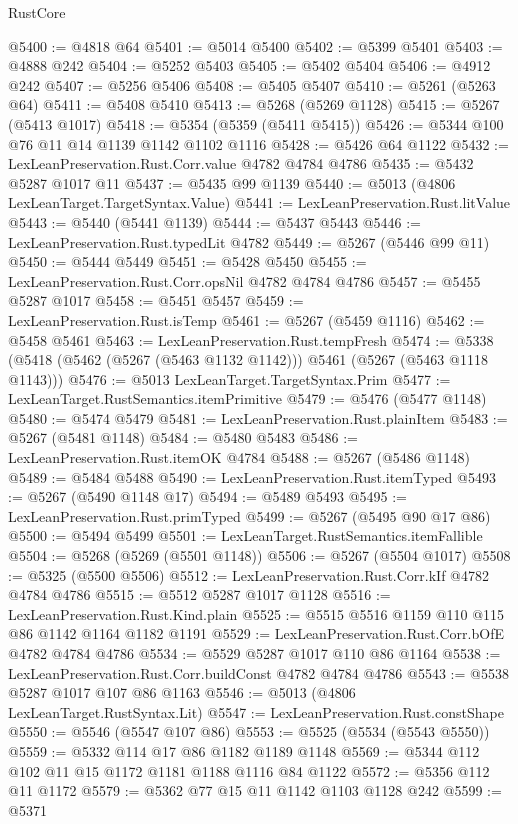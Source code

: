 \begin{lexlean}{RustCore}
\begin{coremodule}
@5400 := @4818 @64
@5401 := @5014 @5400
@5402 := @5399 @5401
@5403 := @4888 @242
@5404 := @5252 @5403
@5405 := @5402 @5404
@5406 := @4912 @242
@5407 := @5256 @5406
@5408 := @5405 @5407
@5410 := @5261 (@5263 @64)
@5411 := @5408 @5410
@5413 := @5268 (@5269 @1128)
@5415 := @5267 (@5413 @1017)
@5418 := @5354 (@5359 (@5411 @5415))
@5426 := @5344 @100 @76 @11 @14 @1139 @1142 @1102 @1116
@5428 := @5426 @64 @1122
@5432 := LexLeanPreservation.Rust.Corr.value @4782 @4784 @4786
@5435 := @5432 @5287 @1017 @11
@5437 := @5435 @99 @1139
@5440 := @5013 (@4806 LexLeanTarget.TargetSyntax.Value)
@5441 := LexLeanPreservation.Rust.litValue
@5443 := @5440 (@5441 @1139)
@5444 := @5437 @5443
@5446 := LexLeanPreservation.Rust.typedLit @4782
@5449 := @5267 (@5446 @99 @11)
@5450 := @5444 @5449
@5451 := @5428 @5450
@5455 := LexLeanPreservation.Rust.Corr.opsNil @4782 @4784 @4786
@5457 := @5455 @5287 @1017
@5458 := @5451 @5457
@5459 := LexLeanPreservation.Rust.isTemp
@5461 := @5267 (@5459 @1116)
@5462 := @5458 @5461
@5463 := LexLeanPreservation.Rust.tempFresh
@5474 := @5338 (@5418 (@5462 (@5267 (@5463 @1132 @1142))) @5461 (@5267 (@5463 @1118 @1143)))
@5476 := @5013 LexLeanTarget.TargetSyntax.Prim
@5477 := LexLeanTarget.RustSemantics.itemPrimitive
@5479 := @5476 (@5477 @1148)
@5480 := @5474 @5479
@5481 := LexLeanPreservation.Rust.plainItem
@5483 := @5267 (@5481 @1148)
@5484 := @5480 @5483
@5486 := LexLeanPreservation.Rust.itemOK @4784
@5488 := @5267 (@5486 @1148)
@5489 := @5484 @5488
@5490 := LexLeanPreservation.Rust.itemTyped
@5493 := @5267 (@5490 @1148 @17)
@5494 := @5489 @5493
@5495 := LexLeanPreservation.Rust.primTyped
@5499 := @5267 (@5495 @90 @17 @86)
@5500 := @5494 @5499
@5501 := LexLeanTarget.RustSemantics.itemFallible
@5504 := @5268 (@5269 (@5501 @1148))
@5506 := @5267 (@5504 @1017)
@5508 := @5325 (@5500 @5506)
@5512 := LexLeanPreservation.Rust.Corr.kIf @4782 @4784 @4786
@5515 := @5512 @5287 @1017 @1128
@5516 := LexLeanPreservation.Rust.Kind.plain
@5525 := @5515 @5516 @1159 @110 @115 @86 @1142 @1164 @1182 @1191
@5529 := LexLeanPreservation.Rust.Corr.bOfE @4782 @4784 @4786
@5534 := @5529 @5287 @1017 @110 @86 @1164
@5538 := LexLeanPreservation.Rust.Corr.buildConst @4782 @4784 @4786
@5543 := @5538 @5287 @1017 @107 @86 @1163
@5546 := @5013 (@4806 LexLeanTarget.RustSyntax.Lit)
@5547 := LexLeanPreservation.Rust.constShape
@5550 := @5546 (@5547 @107 @86)
@5553 := @5525 (@5534 (@5543 @5550))
@5559 := @5332 @114 @17 @86 @1182 @1189 @1148
@5569 := @5344 @112 @102 @11 @15 @1172 @1181 @1188 @1116 @84 @1122
@5572 := @5356 @112 @11 @1172
@5579 := @5362 @77 @15 @11 @1142 @1103 @1128 @242
@5599 := @5371

\end{coremodule}
\end{lexlean}
